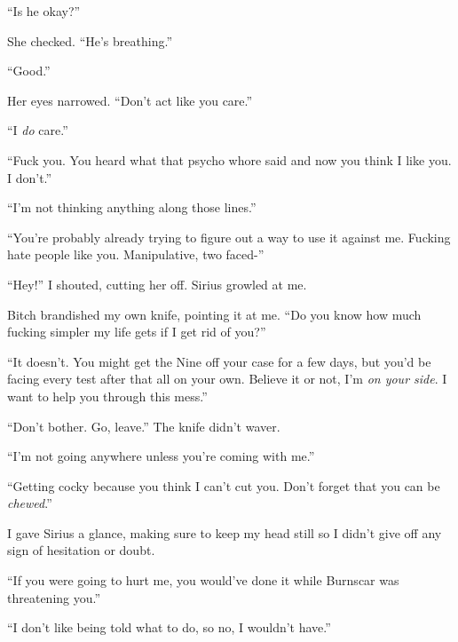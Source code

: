 ``Is he okay?''



She checked.  ``He's breathing.''



``Good.''



Her eyes narrowed. ``Don't act like you care.''



``I \emph{do} care.''



``Fuck you.  You heard what that psycho whore said and now you think I like you.  I don't.''



``I'm not thinking anything along those lines.''



``You're probably already trying to figure out a way to use it against me.  Fucking hate people like you.  Manipulative, two faced-''



``Hey!'' I shouted, cutting her off.  Sirius growled at me.



Bitch brandished my own knife, pointing it at me.  ``Do you know how much fucking simpler my life gets if I get rid of you?''



``It doesn't.  You might get the Nine off your case for a few days, but you'd be facing every test after that all on your own.  Believe it or not, I'm \emph{on your side}.  I want to help you through this mess.''



``Don't bother.  Go, leave.''  The knife didn't waver.



``I'm not going anywhere unless you're coming with me.''



``Getting cocky because you think I can't cut you.  Don't forget that you can be \emph{chewed}.''



I gave Sirius a glance, making sure to keep my head still so I didn't give off any sign of hesitation or doubt.



``If you were going to hurt me, you would've done it while Burnscar was threatening you.''



``I don't like being told what to do, so no, I wouldn't have.''




